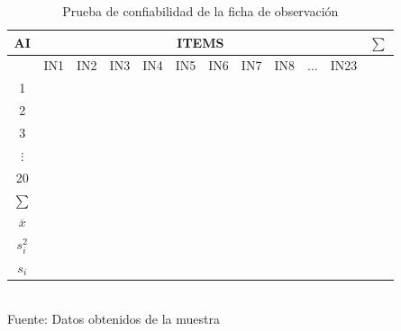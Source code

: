 \documentclass[12pt,a4paper]{article}
\begin{document}
\begin{table}[ht!]
		\caption{Prueba de confiabilidad de la ficha de observación}\label{pret:1}
		\begin{tabular}{cccccccccccc}%
			\toprule 
			AI             & \multicolumn{10}{c}{ITEMS} & $\sum$                                                         \\\midrule
			               & IN1                        & IN2    & IN3 & IN4 & IN5 & IN6 & IN7 & IN8 & $\ldots$ & IN23 & \\\cline{2-11}
			1              &                            &        &     &     &     &     &     &     &          &      & \\
			2              &                            &        &     &     &     &     &     &     &          &      & \\
			3              &                            &        &     &     &     &     &     &     &          &      & \\
			$\vdots$       &                            &        &     &     &     &     &     &     &          &      & \\
			20             &                            &        &     &     &     &     &     &     &          &      & \\\midrule
			$\sum$         &                            &        &     &     &     &     &     &     &          &      & \\
			$\overline{x}$ &                            &        &     &     &     &     &     &     &          &      & \\
			$s_i^2$        &                            &        &     &     &     &     &     &     &          &      & \\
			$s_i$          &                            &        &     &     &     &     &     &     &          &      & \\\bottomrule
		\end{tabular}\\\vspace{0.1cm}
		{\normalsize Fuente: Datos obtenidos de la muestra}
\end{table}


\end{document}
